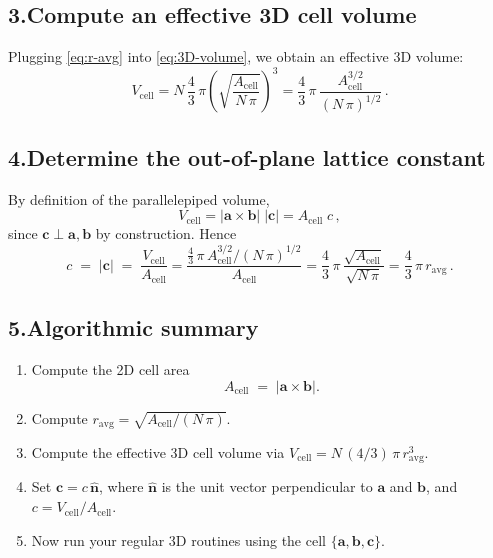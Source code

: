 \documentclass{article}
\begin{document}
\subsection*{3.\quad Compute an effective 3D cell volume}

Plugging \eqref{eq:r-avg} into \eqref{eq:3D-volume}, we obtain an effective 3D volume:
\begin{equation}
  V_\mathrm{cell}
  = N \,\frac{4}{3}\,\pi
    \left(\sqrt{\frac{A_\mathrm{cell}}{N\,\pi}}\right)^{\!3}
  = \frac{4}{3}\,\pi
    \,\frac{A_\mathrm{cell}^{3/2}}{(N\,\pi)^{1/2}}
  \,.
  \label{eq:V-cell-effective}
\end{equation}

\subsection*{4.\quad Determine the out-of-plane lattice constant}

By definition of the parallelepiped volume,
\[
  V_\mathrm{cell}
  = \bigl|\mathbf{a}\times\mathbf{b}\bigr|\;|\mathbf{c}|
  = A_\mathrm{cell}\;c
  \,,
\]
since $\mathbf{c}\perp\mathbf{a},\mathbf{b}$ by construction.  Hence
\begin{equation}
  c \;=\; |\mathbf{c}|
  \;=\;
  \frac{V_\mathrm{cell}}{A_\mathrm{cell}}
  = \frac{\displaystyle
      \frac{4}{3}\,\pi
      \,A_\mathrm{cell}^{3/2}/(N\,\pi)^{1/2}
    }{A_\mathrm{cell}}
  = \frac{4}{3}\,\pi
    \,\frac{\sqrt{A_\mathrm{cell}}}{\sqrt{N\,\pi}}
  = \frac{4}{3}\,\pi\,r_\mathrm{avg}
  \,.
  \label{eq:c-length}
\end{equation}

\subsection*{5.\quad Algorithmic summary}

\begin{enumerate}
  \item Compute the 2D cell area
    \[
      A_\mathrm{cell} \;=\; \bigl|\mathbf{a}\times\mathbf{b}\bigr|.
    \]
  \item Compute
    \(\displaystyle r_\mathrm{avg} = \sqrt{A_\mathrm{cell}/(N\,\pi)}\).
  \item Compute the effective 3D cell volume via
    \(\displaystyle V_\mathrm{cell} = N\,(4/3)\,\pi\,r_\mathrm{avg}^3\).
  \item Set
    \(\displaystyle \mathbf{c} = c\,\hat{\mathbf{n}}\),
    where \(\hat{\mathbf{n}}\) is the unit vector perpendicular to
    \(\mathbf{a}\) and \(\mathbf{b}\), and
    \(\displaystyle c = V_\mathrm{cell}/A_\mathrm{cell}\).
  \item Now run your regular 3D routines using the cell
    \(\{\mathbf{a},\mathbf{b},\mathbf{c}\}\).
\end{enumerate}
\end{document}

